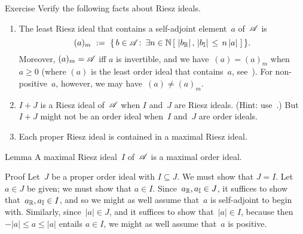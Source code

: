 \documentclass[a]{subfiles}
\begin{document}
\begin{parsec}
\begin{point}{Exercise}
Verify the following facts about Riesz ideals.
\begin{enumerate}
\item
The least Riesz ideal that contains a self-adjoint element~$a$
of~$\mathscr{A}$ is
\begin{equation*}
(a)_m\ :=\ \{\,b\in \mathscr{A}\colon\, 
\exists n\in \mathbb{N}\,[\ \left|b_{\mathbb{R}}\right|,\,\left|b_{\mathbb{I}}\right|
\,\leq\, n\left|a\right| \ ]\,\}.
\end{equation*}
Moreover,  $(a)_m=\mathscr{A}$ iff $a$ is invertible,
and we have~$(a)=(a)_m$ when~$a\geq 0$
(where $(a)$ is the least order ideal that contains~$a$,
see~).
For non-positive~$a$, however, we may have~$(a)\neq (a)_m$.
\item
$I+J$ is a Riesz ideal of~$\mathscr{A}$
when $I$ and~$J$ are Riesz ideals. (Hint: use~.)
But~$I+J$ might not be an order ideal
when~$I$ and~$J$ are order ideals.

\item
Each proper Riesz ideal is contained in a maximal Riesz ideal.
\end{enumerate}
\end{point}
\begin{point}{Lemma}%
A maximal Riesz ideal~$I$ of~$\mathscr{A}$
is a maximal order ideal.
\begin{point}{Proof}%
Let~$J$ be a proper order ideal with $I\subseteq J$.
We must show that $J=I$.
Let~$a\in J$ be given;
we must show that $a\in I$.
Since~$a_{\mathbb{R}},a_{\mathbb{I}}\in J$,
it suffices to show that~$a_{\mathbb{R}},a_{\mathbb{I}}\in I$,
and so we might as well assume that~$a$ is self-adjoint
to begin with.
Similarly,
since~$\left|a\right|\in J$,
and it suffices to show that~$\left|a\right|\in I$,
because then $-\left|a\right|\leq a\leq \left|a\right|$
entails $a\in I$,
we might as well assume that~$a$ is positive.


\end{point}
\end{point}
\end{parsec}
\end{document}
